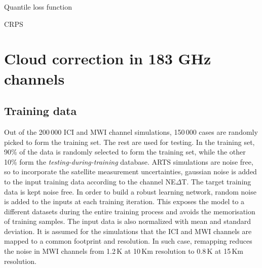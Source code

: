 \documentclass[amt, manuscript]{copernicus}
\begin{document}
Quantile loss function

CRPS


\section{Cloud correction in  183 GHz channels}
%
\subsection{Training data}
%
Out of the 200\,000 ICI and MWI channel simulations, 150\,000 cases are randomly picked to form the training set. The rest are used for testing. In the training set, 90\% of the data is randomly selected to form the training set, while the other 10\% form the \textit{testing-during-training} database. ARTS simulations are noise free, so to incorporate the satellite measurement uncertainties, gaussian noise is added to the input training data according to the channel NE$\Delta$T. The target training data is kept noise free. In order to build a robust learning network, random noise is added to the inputs at each training iteration. This exposes the model to a different datasets during the entire training process and avoids the memorisation of training samples. The input data is also normalized with mean and standard deviation.
It is assumed for the simulations that the ICI and MWI channels are mapped to a common footprint and resolution. In such case, remapping reduces the noise in MWI channels from 1.2\,K at 10\,Km resolution to 0.8\,K at 15\,Km resolution.
\end{document}
